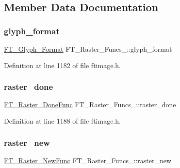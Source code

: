 \subsection{Member Data Documentation}
\mbox{\label{struct_f_t___raster___funcs___a741b43afa16f1f1b7f633cebd9f1d6a9}} 
\subsubsection{\texorpdfstring{glyph\_format}{glyph\_format}}
{\footnotesize\ttfamily \mbox{\hyperlink{ftimage_8h_aeca0d10a27aedecbf96515e0628aff1f}{F\+T\+\_\+\+Glyph\+\_\+\+Format}} F\+T\+\_\+\+Raster\+\_\+\+Funcs\+\_\+\+::glyph\+\_\+format}



Definition at line 1182 of file ftimage.\+h.

\mbox{\label{struct_f_t___raster___funcs___aecfd50bb6567d4442c997467cd68c857}} 
\subsubsection{\texorpdfstring{raster\_done}{raster\_done}}
{\footnotesize\ttfamily \mbox{\hyperlink{ftimage_8h_a2df7d8d26927263fc038263851b18cf6}{F\+T\+\_\+\+Raster\+\_\+\+Done\+Func}} F\+T\+\_\+\+Raster\+\_\+\+Funcs\+\_\+\+::raster\+\_\+done}



Definition at line 1188 of file ftimage.\+h.

\mbox{\label{struct_f_t___raster___funcs___a31c9df9af6636df8a17a11bcd921b6a4}} 
\subsubsection{\texorpdfstring{raster\_new}{raster\_new}}
{\footnotesize\ttfamily \mbox{\hyperlink{ftimage_8h_acfff989cc4f373de6211b12c97a265e8}{F\+T\+\_\+\+Raster\+\_\+\+New\+Func}} F\+T\+\_\+\+Raster\+\_\+\+Funcs\+\_\+\+::raster\+\_\+new}



